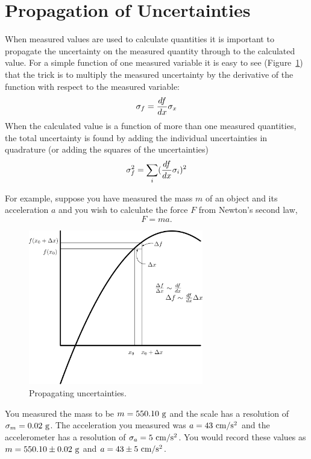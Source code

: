 \section{Propagation of Uncertainties}

When measured values are used to calculate quantities it is important to
propagate the uncertainty on the measured quantity through to the calculated
value.  For a simple function of one measured variable it is easy to see
(Figure~\ref{fig:error-prop})
that the trick is to multiply the measured uncertainty by the derivative of the
function with respect to the measured variable: 
\begin{equation}
\sigma_f = {df \over dx} \sigma_x
\end{equation}
\noindent When the calculated value is a function of more than one measured
quantities, the total uncertainty is found by adding the individual
uncertainties in quadrature (or adding the squares of the uncertainties)
\begin{equation}
\sigma_f^2 = \sum_i ({df \over dx} \sigma_i)^2
\label{eq:error-prop}
\end{equation}

For example, suppose you have measured the mass $m$ of an object and its
acceleration $a$ and you wish to calculate the force $F$ from Newton's second
law,
\begin{equation}
F = ma.
\label{eq:newton}
\end{equation}

\begin{figure}
\includegraphics[width=3in]{../images/error-prop.png}
\caption{Propagating uncertainties.}
\label{fig:error-prop}
\end{figure}
You measured the mass to be $m = 550.10~ {\rm g}$ and the scale has a resolution of $\sigma_m = 0.02 ~{\rm g}$.  The acceleration you measured was $a = 43 ~{\rm cm}/{\rm s}^2$ and the accelerometer has a resolution of $\sigma_a = 5 ~{\rm cm}/{\rm s}^2$.  You would record these values as $m = 550.10 \pm 0.02 ~{\rm g}$ and $a = 43 \pm 5 ~{\rm cm}/{\rm s}^2$.

